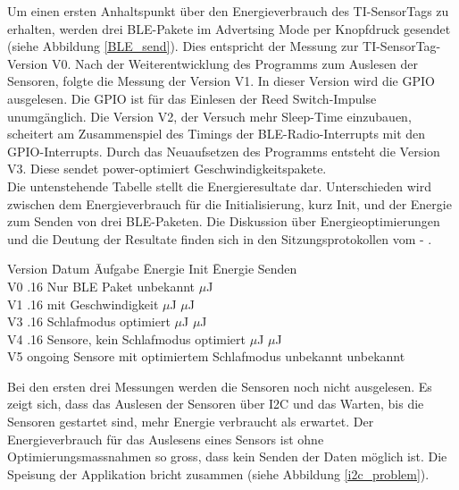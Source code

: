 Um einen ersten Anhaltspunkt über den Energieverbrauch des TI-SensorTags zu erhalten, werden drei BLE-Pakete im Advertsing Mode per Knopfdruck gesendet (siehe Abbildung \ref{BLE_send}). Dies entspricht der Messung zur TI-SensorTag-Version V0. Nach der Weiterentwicklung des Programms zum Auslesen der Sensoren, folgte die Messung der Version V1. In dieser Version wird die GPIO ausgelesen. Die GPIO ist für das Einlesen der Reed Switch-Impulse unumgänglich. Die Version V2, der Versuch mehr Sleep-Time einzubauen, scheitert am Zusammenspiel des Timings der BLE-Radio-Interrupts mit den GPIO-Interrupts. Durch das Neuaufsetzen des Programms entsteht die Version V3. Diese sendet power-optimiert Geschwindigkeitspakete.\\ 

Die untenstehende Tabelle stellt die Energieresultate dar. Unterschieden wird zwischen dem Energieverbrauch für die Initialisierung, kurz Init, und der Energie zum Senden von drei BLE-Paketen. Die Diskussion über Energieoptimierungen und die Deutung der Resultate finden sich in den Sitzungsprotokollen vom \cite{sitzungsprotokoll_160226} - \cite{sitzungsprotokoll_160516_ms3}.\\

\begin{minipage}{\textwidth}
\begin{tabbing}
    Version   \quad\= Datum    \quad\= Aufgabe\hphantom{re, kein Schlafmodus optimiert} \quad\= Energie Init    \quad\=  Energie Senden \\[0.8ex]
    V0        .16  \> Nur BLE Paket      \> unbekannt             $\mu$J \\
    V1        .16  \> mit Geschwindigkeit       $\mu$J             $\mu$J \\
    V3        .16   \> Schlafmodus optimiert      $\mu$J             $\mu$J \\
    V4        .16     Sensore, kein Schlafmodus optimiert      $\mu$J             $\mu$J \\
    V5        \> ongoing     Sensore mit optimiertem Schlafmodus     \> unbekannt           \> unbekannt\\
\end{tabbing}
\end{minipage}

Bei den ersten drei Messungen werden die Sensoren noch nicht ausgelesen. Es zeigt sich, dass das Auslesen der Sensoren über I2C und das Warten, bis die Sensoren gestartet sind,  mehr Energie verbraucht als erwartet. Der Energieverbrauch für das Auslesens eines Sensors ist ohne Optimierungsmassnahmen so gross, dass kein Senden der Daten möglich ist. Die Speisung der Applikation bricht zusammen (siehe Abbildung \ref{i2c_problem}).


